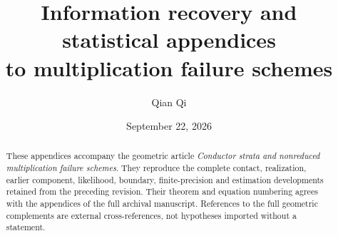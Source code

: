 \documentclass[11pt,reqno]{amsart}
\title[Information recovery and statistical appendices]{Information recovery and statistical appendices\\to multiplication failure schemes}
\author{Qian Qi}
\date{September 22, 2026}
\numberwithin{equation}{section}
\theoremstyle{definition}\newtheorem{definition}[theorem]{Definition}
\theoremstyle{remark}\newtheorem{remark}[theorem]{Remark}
\begin{document}
\begin{abstract}
These appendices accompany the geometric article \emph{Conductor strata
and nonreduced multiplication failure schemes}. They reproduce the
complete contact, realization, earlier component, likelihood, boundary,
finite-precision and estimation developments retained from the preceding
revision. Their theorem and equation numbering agrees with the appendices
of the full archival manuscript. References to the full geometric complements are
external cross-references, not hypotheses imported without a statement.
\end{abstract}
\maketitle
\appendix









\end{document}

